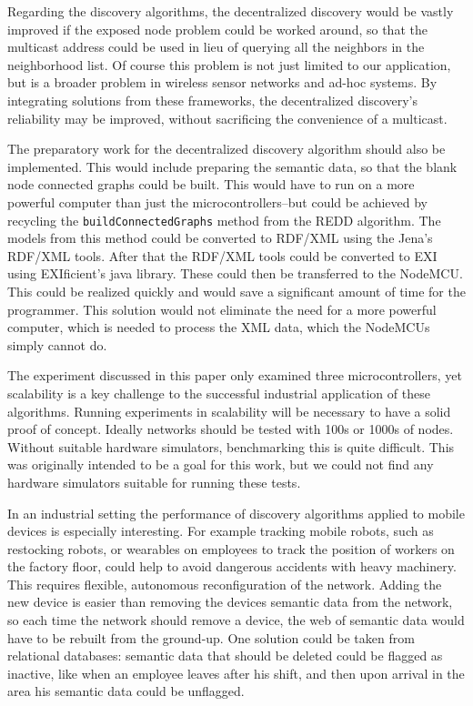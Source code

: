 Regarding the discovery algorithms, the decentralized discovery would be vastly improved if the exposed node problem could be worked around, so that the multicast address could be used in lieu of querying all the neighbors in the neighborhood list. Of course this problem is not just limited to our application, but is a broader problem in wireless sensor networks and ad-hoc systems. By integrating solutions from these frameworks, the decentralized discovery's reliability may be improved, without sacrificing the convenience of a multicast. 

The preparatory work for the decentralized discovery algorithm should also be implemented. This would include preparing the semantic data, so that the blank node connected graphs could be built. This would have to run on a more powerful computer than just the microcontrollers--but could be achieved by recycling the \texttt{buildConnectedGraphs} method from the REDD algorithm. The models from this method could be converted to RDF/XML using the Jena's RDF/XML tools. After that the RDF/XML tools could be converted to EXI using EXIficient's java library. These could then be transferred to the NodeMCU. This could be realized quickly and would save a significant amount of time for the programmer. This solution would not eliminate the need for a more powerful computer, which is needed to process the XML data, which the NodeMCUs simply cannot do.

The experiment discussed in this paper only examined three microcontrollers, yet scalability is a key challenge to the successful industrial application of these algorithms. Running experiments in scalability will be necessary to have a solid proof of concept. Ideally networks should be tested with 100s or 1000s of nodes. Without suitable hardware simulators, benchmarking this is quite difficult. This was originally intended to be a goal for this work, but we could not find any hardware simulators suitable for running these tests.

In an industrial setting the performance of discovery algorithms applied to mobile devices is especially interesting. For example tracking mobile robots, such as restocking robots, or wearables on employees to track the position of workers on the factory floor, could help to avoid dangerous accidents with heavy machinery. This requires flexible, autonomous reconfiguration of the network. Adding the new device is easier than removing the devices semantic data from the network, so each time the network should remove a device, the web of semantic data would have to be rebuilt from the ground-up. One solution could be taken from relational databases: semantic data that should be deleted could be flagged as inactive, like when an employee leaves after his shift, and then upon arrival in the area his semantic data could be unflagged.